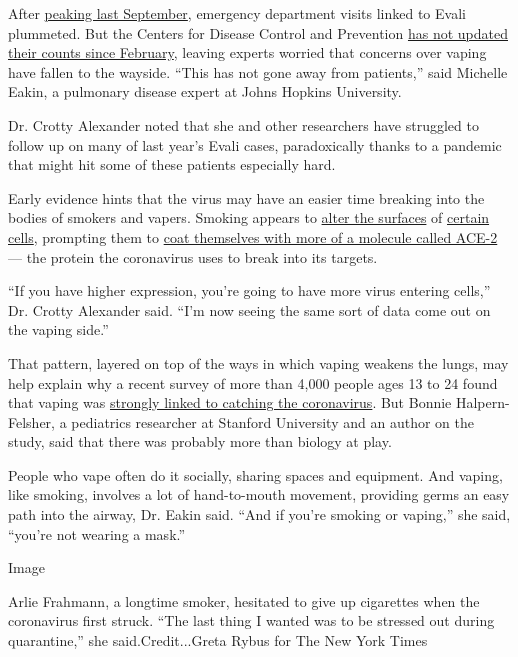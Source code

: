 After
\href{https://www.nytimes3xbfgragh.onion/interactive/2019/health/vaping-illness-tracker.html}{peaking
last September}, emergency department visits linked to Evali plummeted.
But the Centers for Disease Control and Prevention
\href{https://www.cdc.gov/tobacco/basic_information/e-cigarettes/severe-lung-disease.html\#latest-outbreak-information}{has
not updated their counts since February}, leaving experts worried that
concerns over vaping have fallen to the wayside. ``This has not gone
away from patients,'' said Michelle Eakin, a pulmonary disease expert at
Johns Hopkins University.

Dr. Crotty Alexander noted that she and other researchers have struggled
to follow up on many of last year's Evali cases, paradoxically thanks to
a pandemic that might hit some of these patients especially hard.

Early evidence hints that the virus may have an easier time breaking
into the bodies of smokers and vapers. Smoking appears to
\href{https://www.medrxiv.org/content/10.1101/2020.02.05.20020107v1?versioned=true}{alter
the surfaces} of
\href{https://www.medrxiv.org/content/10.1101/2020.02.05.20020107v3}{certain
cells}, prompting them to
\href{https://www.ncbi.nlm.nih.gov/pmc/articles/PMC7301735/}{coat
themselves with more of a molecule called ACE-2} --- the protein the
coronavirus uses to break into its targets.

``If you have higher expression, you're going to have more virus
entering cells,'' Dr. Crotty Alexander said. ``I'm now seeing the same
sort of data come out on the vaping side.''

That pattern, layered on top of the ways in which vaping weakens the
lungs, may help explain why a recent survey of more than 4,000 people
ages 13 to 24 found that vaping was
\href{https://www.sciencedirect.com/science/article/pii/S1054139X20303992}{strongly
linked to catching the coronavirus}. But Bonnie Halpern-Felsher, a
pediatrics researcher at Stanford University and an author on the study,
said that there was probably more than biology at play.

People who vape often do it socially, sharing spaces and equipment. And
vaping, like smoking, involves a lot of hand-to-mouth movement,
providing germs an easy path into the airway, Dr. Eakin said. ``And if
you're smoking or vaping,'' she said, ``you're not wearing a mask.''

Image

Arlie Frahmann, a longtime smoker, hesitated to give up cigarettes when
the coronavirus first struck. ``The last thing I wanted was to be
stressed out during quarantine,'' she said.Credit...Greta Rybus for The
New York Times

